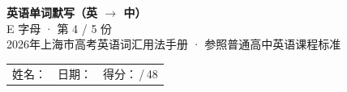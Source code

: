 \documentclass[10pt,a4paper]{article}
\begin{document}
\pagestyle{plain}

\begin{center}
{\LARGE\bfseries 英语单词默写（英 $\to$ 中）}\\[0.22em]
{\large E 字母 · 第 4 / 5 份}\\[0.18em]
{\small 2026年上海市高考英语词汇用法手册 · 参照普通高中英语课程标准}
\end{center}

\vspace{0.25em}
\noindent\begin{tabular}{@{}p{}@{}p{}@{}p{}@{}}
姓名：\underline{\hspace{2.0cm}} & 日期：\underline{\hspace{2.0cm}} & 得分：\underline{\hspace{1.3cm}}\,/\,48 \\
\end{tabular}

\vspace{0.3em}

\vspace{0.08em}
\end{document}
